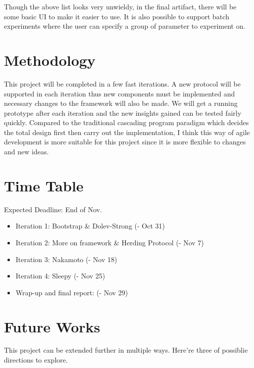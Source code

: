\documentclass{article}
\begin{document}
	Though the above list looks very unwieldy, in the final artifact, there will be some basic UI to make it easier to use. It is also possible to support batch experiments where the user can specify a group of parameter to experiment on.

	\section{Methodology}
	
	This project will be completed in a few fast iterations. A new protocol will be supported in each iteration thus new components must be implemented and necessary changes to the framework will also be made. We will get a running prototype after each iteration and the new insights gained can be tested fairly quickly. Compared to the traditional cascading program paradigm which decides the total design first then carry out the implementation, I think this way of agile development is more suitable for this project since it is more flexible to changes and new ideas.

	\section{Time Table}
	
	Expected Deadline: End of Nov.
	
	\begin{itemize}
		\item Iteration 1: Bootstrap \& Dolev-Strong (- Oct 31)
		\item Iteration 2: More on framework \& Herding Protocol (- Nov 7)
		\item Iteration 3: Nakamoto (- Nov 18)
		\item Iteration 4: Sleepy (- Nov 25)
		\item Wrap-up and final report: (- Nov 29)
	\end{itemize}
	
	\section{Future Works}
	
	This project can be extended further in multiple ways. Here're three of possiblie directions to explore.
	
\end{document}
